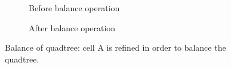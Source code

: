     \begin{figure}[h!]
        \begin{subfigure}[b]{0.5\linewidth}
            \centering
            \caption{Before balance operation}
        \end{subfigure}
        \begin{subfigure}[b]{0.5\linewidth}
            \centering
            \caption{After balance operation}
        \end{subfigure}
        \caption{Balance of quadtree: cell A is refined in order to balance the quadtree.}
        \label{qdt_fig:tree_balance_quadtree}
    \end{figure}
